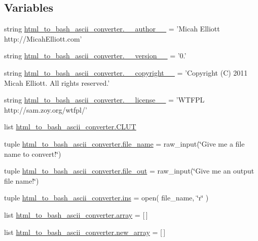 \subsection*{Variables}
\begin{DoxyCompactItemize}
\item 
string \hyperlink{namespacehtml__to__bash__ascii__converter_ada82e810207023e3a203646f9a522180}{html\-\_\-to\-\_\-bash\-\_\-ascii\-\_\-converter.\-\_\-\-\_\-author\-\_\-\-\_\-} = 'Micah Elliott http\-://Micah\-Elliott.\-com'
\item 
string \hyperlink{namespacehtml__to__bash__ascii__converter_a937fe091f7f5049b61c912d08f211cd7}{html\-\_\-to\-\_\-bash\-\_\-ascii\-\_\-converter.\-\_\-\-\_\-version\-\_\-\-\_\-} = '0.'
\item 
string \hyperlink{namespacehtml__to__bash__ascii__converter_a0d3762ea7dad16c05073a567ff6d0d0e}{html\-\_\-to\-\_\-bash\-\_\-ascii\-\_\-converter.\-\_\-\-\_\-copyright\-\_\-\-\_\-} = 'Copyright (C) 2011 Micah Elliott. All rights reserved.'
\item 
string \hyperlink{namespacehtml__to__bash__ascii__converter_add6f787e8185652126e45cf581b34d32}{html\-\_\-to\-\_\-bash\-\_\-ascii\-\_\-converter.\-\_\-\-\_\-license\-\_\-\-\_\-} = 'W\-T\-F\-P\-L http\-://sam.\-zoy.\-org/wtfpl/'
\item 
list \hyperlink{namespacehtml__to__bash__ascii__converter_aca623d307673341a5040390d44ab99ba}{html\-\_\-to\-\_\-bash\-\_\-ascii\-\_\-converter.\-C\-L\-U\-T}
\item 
tuple \hyperlink{namespacehtml__to__bash__ascii__converter_acbc9db9cfd7871bf001658ddbadf55d5}{html\-\_\-to\-\_\-bash\-\_\-ascii\-\_\-converter.\-file\-\_\-name} = raw\-\_\-input(\char`\"{}Give me a file name to convert!\char`\"{})
\item 
tuple \hyperlink{namespacehtml__to__bash__ascii__converter_a1c2d3151ba54e82095aeb258aad527ea}{html\-\_\-to\-\_\-bash\-\_\-ascii\-\_\-converter.\-file\-\_\-out} = raw\-\_\-input(\char`\"{}Give me an output file name!\char`\"{})
\item 
tuple \hyperlink{namespacehtml__to__bash__ascii__converter_afb34cd1d39ae35f71c6a5d6d0b7419e3}{html\-\_\-to\-\_\-bash\-\_\-ascii\-\_\-converter.\-ins} = open( file\-\_\-name, \char`\"{}r\char`\"{} )
\item 
list \hyperlink{namespacehtml__to__bash__ascii__converter_ad57a10a30c2373374b5b77aee25d400f}{html\-\_\-to\-\_\-bash\-\_\-ascii\-\_\-converter.\-array} = \mbox{[}$\,$\mbox{]}
\item 
list \hyperlink{namespacehtml__to__bash__ascii__converter_ad4cf37b49af00dca8d9496f17fdae9e7}{html\-\_\-to\-\_\-bash\-\_\-ascii\-\_\-converter.\-new\-\_\-array} = \mbox{[}$\,$\mbox{]}

\end{DoxyCompactItemize}

